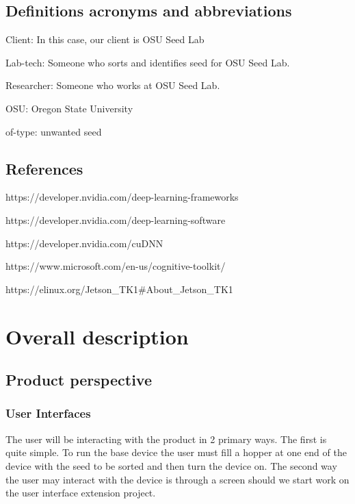 \documentclass[onecolumn, draftclsnofoot,10pt, compsoc]{IEEEtran}
\begin{document}
\subsection{Definitions acronyms and abbreviations}

Client: In this case, our client is OSU Seed Lab

Lab-tech: Someone who sorts and identifies seed for OSU Seed Lab.

Researcher: Someone who works at OSU Seed Lab.

OSU: Oregon State University

of-type: unwanted seed

\subsection{References}
https://developer.nvidia.com/deep-learning-frameworks

https://developer.nvidia.com/deep-learning-software

https://developer.nvidia.com/cuDNN

https://www.microsoft.com/en-us/cognitive-toolkit/

https://elinux.org/Jetson\_TK1\#About\_Jetson\_TK1


\section{Overall description}

\subsection{Product perspective}

\subsubsection{User Interfaces}
The user will be interacting with the product in 2 primary ways.
The first is quite simple.
To run the base device the user must fill a hopper at one end of the device with the seed to be sorted and then turn the device on.
The second way the user may interact with the device is through a screen should we start work on the user interface extension project.
\end{document}
